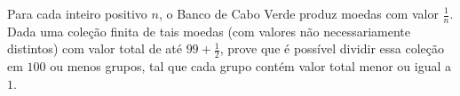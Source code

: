 Para cada inteiro positivo $n$, o Banco de Cabo Verde produz moedas com valor $\frac{1}{n}$.
Dada uma coleção finita de tais moedas (com valores não necessariamente distintos) com valor total de até $99+\frac12$, prove que é possível dividir essa coleção em $100$ ou menos grupos, tal que cada grupo contém valor total menor ou igual a $1$.
